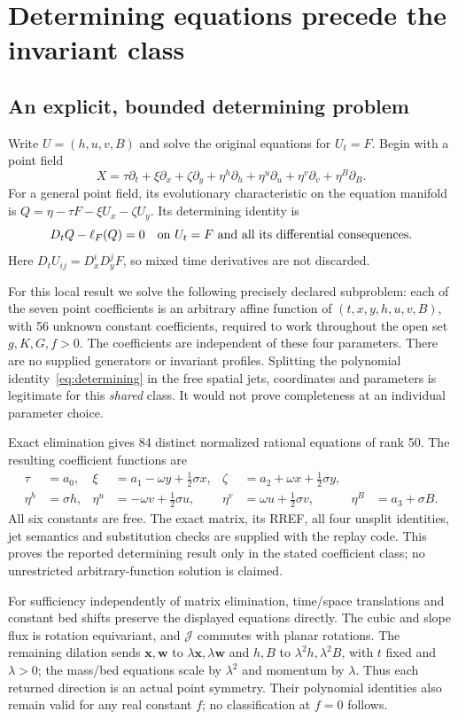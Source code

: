 \documentclass[11pt]{article}
\theoremstyle{remark}\newtheorem{remark}[theorem]{Remark}
\begin{document}
\section{Determining equations precede the invariant class}
\subsection{An explicit, bounded determining problem}
Write $U=(h,u,v,B)$ and solve the original equations for $U_t=F$.
Begin with a point field
\[
X=\tau\partial_t+\xi\partial_x+\zeta\partial_y+
\eta^h\partial_h+\eta^u\partial_u+\eta^v\partial_v+\eta^B\partial_B.
\]
For a general point field, its evolutionary characteristic on the equation
manifold is $Q=\eta-\tau F-\xi U_x-\zeta U_y$. Its determining identity is
\begin{equation}
D_tQ-\ell_F(Q)=0\quad\hbox{on }U_t=F\hbox{ and all its differential consequences}.
\label{eq:determining}
\end{equation}
Here $D_tU_{ij}=D_x^iD_y^jF$, so mixed time derivatives are not discarded.

For this local result we solve the following precisely declared subproblem:
each of the seven point coefficients is an arbitrary affine function of
$(t,x,y,h,u,v,B)$, with 56 unknown constant coefficients, required to work
throughout the open set $g,K,G,f>0$. The coefficients are independent of these
four parameters. There are no supplied generators or invariant profiles.
Splitting the polynomial identity~\eqref{eq:determining} in the free spatial
jets, coordinates and parameters is legitimate for this \emph{shared} class.
It would not prove completeness at an individual parameter choice.

Exact elimination gives 84 distinct normalized rational equations of rank 50.
The resulting coefficient functions are
\begin{align*}
\tau&=a_0,&\xi&=a_1-\omega y+\tfrac12\sigma x,&
\zeta&=a_2+\omega x+\tfrac12\sigma y,\\
\eta^h&=\sigma h,&\eta^u&=-\omega v+\tfrac12\sigma u,&
\eta^v&=\omega u+\tfrac12\sigma v,&\eta^B&=a_3+\sigma B.
\end{align*}
All six constants are free. The exact matrix, its RREF, all four unsplit
identities, jet semantics and substitution checks are supplied with the
replay code. This proves the reported determining result only in the stated
coefficient class; no unrestricted arbitrary-function solution is claimed.

For sufficiency independently of matrix elimination, time/space translations
and constant bed shifts preserve the displayed equations directly. The cubic
and slope flux is rotation equivariant, and $\mathcal J$ commutes with planar
rotations. The remaining dilation sends $\mathbf x,\mathbf w$ to
$\lambda\mathbf x,\lambda\mathbf w$ and $h,B$ to $\lambda^2h,\lambda^2B$,
with $t$ fixed and $\lambda>0$; the mass/bed equations scale by $\lambda^2$
and momentum by $\lambda$. Thus each returned direction is an actual point
symmetry. Their polynomial identities also remain valid for any real constant
$f$; no classification at $f=0$ follows.
\end{document}
